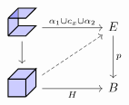 \[
\begin{tikzcd}[column sep = huge]
\begin{tikzpicture}[x = 1.4em, y = 1.4em, z = 0.8em, baseline = 0.4em]
    \begin{scope}[fill=blue, opacity=0.2]
    \fill
    (0,0,0) -- (0,1,0) -- (0,1,1) -- (0,0,1) -- (0,0,0);
    \fill
    (0,0,0) -- (1,0,0) -- (1,0,1) -- (0,0,1) -- (0,0,0);
    \fill
    (0,1,0) -- (1,1,0) -- (1,1,1) -- (0,1,1) -- (0,1,0);
    \end{scope}
    \begin{scope}[thick]
    \draw[black!60]
    (0,0.4,1) -- (0,1,1);
    \draw
    (0,0,1) -- (0,0.45,1)
    (0,0,0) -- (0,1,0)
    (0,0,0) -- (1,0,0) -- (1,0,1) -- (0,0,1) -- (0,0,0)
    (0,1,0) -- (1,1,0) -- (1,1,1) -- (0,1,1) -- (0,1,0);
    \end{scope}
\end{tikzpicture}
\ar[r, "\alpha_1\cup c_x\cup\alpha_2"] \ar[d] & E \ar[d, " p"]\\
\begin{tikzpicture}[x = 1.4em, y = 1.4em, z = 0.8em, baseline = 0.4em]
    \begin{scope}[fill=blue!20, thick]
    \filldraw
    (1,0,0) -- (1,1,0) -- (1,1,1) -- (1,0,1) -- (1,0,0);
    \filldraw
    (1,0,0) -- (1,1,0) -- (0,1,0) -- (0,0,0) -- (1,0,0);
    \filldraw
    (0,1,0) -- (1,1,0) -- (1,1,1) -- (0,1,1) -- (0,1,0);
    \end{scope}
\end{tikzpicture}
\ar[r, "H"'] \ar[ur, dashed] & B
\end{tikzcd}
\]
